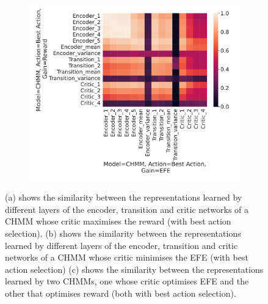 \documentclass[twoside,11pt]{article}
\begin{document}
\begin{figure}[H]
\begin{subfigure}{.3\textwidth}
        \caption{}\label{sfig:cka-chmm2-chmm2-ba}
    \end{subfigure}%
    \begin{subfigure}{.3\textwidth}
        \centering
        \includegraphics[draft=false,width=\linewidth]{cka_figures/CKA_chmm_127_chmm_131}
        \caption{}\label{sfig:cka-chmm-chmm2-ba}
    \end{subfigure}

    \caption{(a) shows the similarity between the representations learned by different layers of the encoder, transition and critic networks of a CHMM whose critic maximises the reward (with best action selection).
        (b) shows the similarity between the representations learned by different layers of the encoder, transition and critic networks of a CHMM whose critic minimises the EFE (with best action selection)
        (c) shows the similarity between the representations learned by two CHMMs, one whose critic optimises EFE and the other that optimises reward (both with best action selection).
    }
    \label{fig:cka-chmm-ba}
\end{figure}
\end{document}
